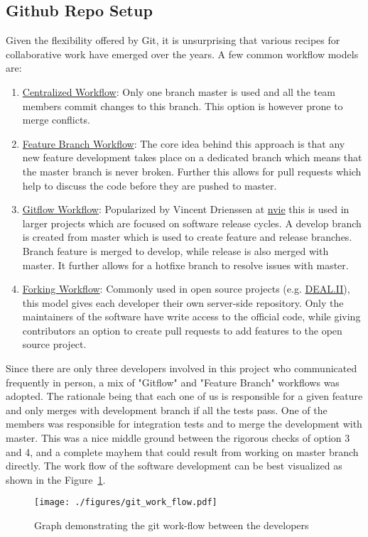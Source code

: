 \subsection{Github Repo Setup}
Given the flexibility offered by Git, it is unsurprising that various recipes for collaborative work have emerged over the years. A few common workflow models are:
\begin{enumerate}
	\item \href{https://www.atlassian.com/git/tutorials/comparing-workflows#centralized-workflow}{Centralized Workflow}: Only one branch {\ttfamily master} is used and all the team members commit changes to this branch. This option is however prone to merge conflicts.
	\item \href{https://www.atlassian.com/git/tutorials/comparing-workflows/feature-branch-workflow}{Feature Branch Workflow}: The core idea behind this approach is that any new feature development takes place on a dedicated branch which means that the {\ttfamily master} branch is never broken. Further this allows for pull requests which help to discuss the code before they are pushed to {\ttfamily master}.
	\item \href{https://www.atlassian.com/git/tutorials/comparing-workflows/gitflow-workflow}{Gitflow Workflow}: Popularized by Vincent Drienssen at \href{https://nvie.com/posts/a-successful-git-branching-model/}{nvie} this is used in larger projects which are focused on software release cycles. A {\ttfamily develop} branch is created from {\ttfamily master} which is used to create {\ttfamily feature} and {\ttfamily release} branches. Branch {\ttfamily feature} is merged to {\ttfamily develop}, while {\ttfamily release} is also merged with {\ttfamily master}. It further allows for a {\ttfamily hotfixe} branch to resolve issues with master.
	\item \href{https://www.atlassian.com/git/tutorials/comparing-workflows/forking-workflow}{Forking Workflow}: Commonly used in open source projects (e.g. \href{https://github.com/dealii/dealii}{DEAL.II}), this model gives each developer their own server-side repository. Only the maintainers of the software have write access to the official code, while giving contributors an option to create pull requests to add features to the open source project.
\end{enumerate}
Since there are only three developers involved in this project who communicated frequently in person, a mix of "Gitflow" and "Feature Branch" workflows was adopted. The rationale being that each one of us is responsible for a given feature and only merges with {\ttfamily development} branch if all the tests pass. One of the members was responsible for integration tests and to merge the {\ttfamily development} with {\ttfamily master}. This was a nice middle ground between the rigorous checks of option 3 and 4, and a complete mayhem that could result from working on master branch directly. The work flow of the software development can be best visualized as shown in the Figure~\ref{fig:git_structure}.
\begin{figure}[H]
	\centering
	\texttt{[image: ./figures/git\_work\_flow.pdf]}
	\caption{\label{fig:git_structure} Graph demonstrating the git work-flow between the developers}
\end{figure}
